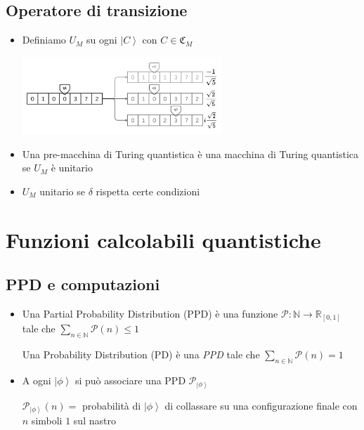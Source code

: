 \documentclass{beamer}
\newcommand{\ket}[1]{\left | #1 \right \rangle}
\newcommand{\conf}{\mathfrak{C}_{M}}
\begin{document}
\subsection{Operatore di transizione}

\begin{frame}{\subsecname}{}
	\begin{itemize}
		\item<+-> Definiamo \( U_{M} \) su ogni \(\ket{C} \) con \( C \in \conf \) \par
		\centering\includegraphics[width=7.5cm]{transition2.png}
		\item<+-> Una pre-macchina di Turing quantistica è una \alert{macchina di Turing quantistica} se \( U_{M} \) è unitario
		\item<+-> \( U_{M} \) unitario se \(\delta\) rispetta certe condizioni
	\end{itemize}
\end{frame}

\section{Funzioni calcolabili quantistiche}

\subsection{PPD e computazioni}

\begin{frame}{\secname}{\subsecname}
	\begin{itemize}
		\item<+-> Una \alert{\foreignlanguage{english}{Partial Probability Distribution} (PPD)} è una funzione \( \mathcal{P} : \mathbb{N} \rightarrow \mathbb{R}_{[0,1]} \) tale che \( \sum_{n \in \mathbb{N}} \mathcal{P} \left ( n \right ) \le 1 \)\par
		Una \alert{\foreignlanguage{english}{Probability Distribution} (PD)} è una \textit{PPD} tale che \( \sum_{n \in \mathbb{N}} \mathcal{P} \left ( n \right ) = 1 \)
		\item<+-> A ogni \( \ket{\phi} \) si può associare una PPD \( \mathcal{P}_{\ket{\phi}} \)\par
		\( \mathcal{P}_{\ket{\phi}} \left ( n \right ) = \) probabilità di \( \ket{\phi} \) di collassare su una configurazione finale con \(n\) simboli \(1\) sul nastro
	\end{itemize}
\end{frame}
\end{document}
